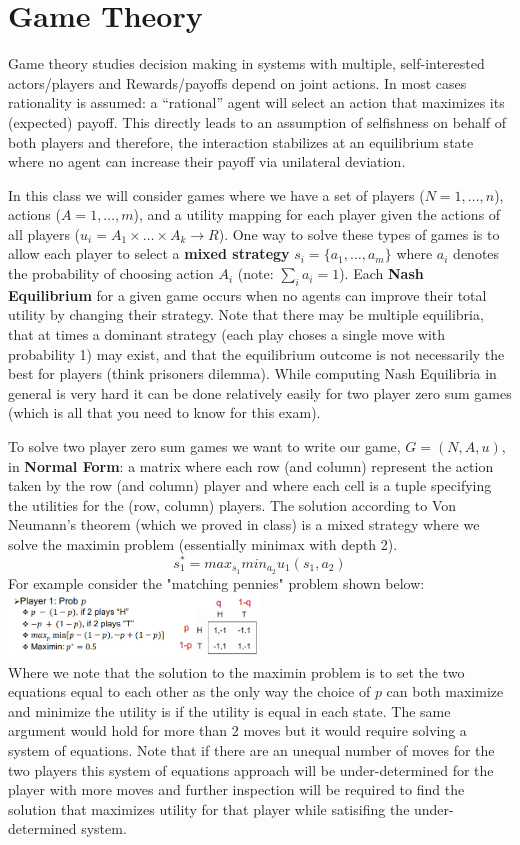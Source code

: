 \documentclass[11pt]{article}
\begin{document}
\section{Game Theory}
Game theory studies decision making in systems with multiple, self-interested actors/players and Rewards/payoffs depend on joint actions. In most cases rationality is assumed: a “rational” agent will select an action that maximizes its (expected) payoff. This directly leads to an assumption of selfishness on behalf of both players and therefore, the interaction stabilizes at an equilibrium state where no agent can increase their payoff via unilateral deviation.

In this class we will consider games where we have a set of players ($N = {1, \ldots , n}$), actions ($A = {1, \ldots , m}$), and a utility mapping for each player given the actions of all players ($u_i = A_1 \times \ldots \times A_k \rightarrow R$). One way to solve these types of games is to allow each player to select a \textbf{mixed strategy} $s_i = \{a_1, \dots, a_m \}$ where $a_i$ denotes the probability of choosing action $A_i$ (note: $\sum_i a_i = 1$). Each \textbf{Nash Equilibrium} for a given game occurs when no agents can improve their total utility by changing their strategy. Note that there may be multiple equilibria, that at times a dominant strategy (each play choses a single move with probability 1) may exist, and that the equilibrium outcome is not necessarily the best for players (think prisoners dilemma). While computing Nash Equilibria in general is very hard it can be done relatively easily for two player zero sum games (which is all that you need to know for this exam).

To solve two player zero sum games we want to write our game, $G = (N,A,u)$, in \textbf{Normal Form}: a matrix where each row (and column) represent the action taken by the row (and column) player and where each cell is a tuple specifying the utilities for the (row, column) players. The solution according to Von Neumann’s theorem (which we proved in class) is a mixed strategy where we solve the maximin problem (essentially minimax with depth 2).
$$ s_1^* = max_{s_1} min_{a_2} u_1(s_1, a_2)$$
For example consider the "matching pennies" problem shown below:\\
\includegraphics[width=0.5\textwidth]{figs/matchingPennies.png}\\
Where we note that the solution to the maximin problem is to set the two equations equal to each other as the only way the choice of $p$ can both maximize and minimize the utility is if the utility is equal in each state. The same argument would hold for more than 2 moves but it would require solving a system of equations. Note that if there are an unequal number of moves for the two players this system of equations approach will be under-determined for the player with more moves and further inspection will be required to find the solution that maximizes utility for that player while satisifing the under-determined system.
\end{document}
